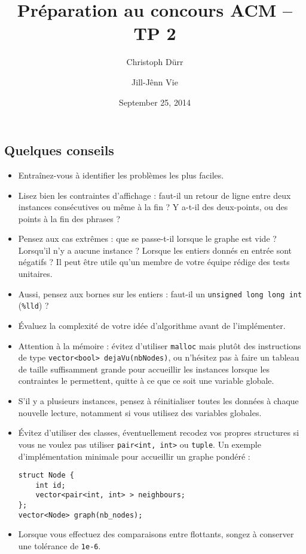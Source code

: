 \documentclass[12pt]{article}
\title{Préparation au concours ACM -- TP 2}
\author{Christoph Dürr \and Jill-Jênn Vie}
\date{September 25, 2014}
\begin{document}
\maketitle
\subsection*{Quelques conseils}

\begin{itemize}
\item Entraînez-vous à identifier les problèmes les plus faciles.
\item Lisez bien les contraintes d'affichage : faut-il un retour de ligne entre deux instances consécutives ou même à la fin ? Y a-t-il des deux-points, ou des points à la fin des phrases ?
\item Pensez aux cas extrêmes : que se passe-t-il lorsque le graphe est vide ? Lorsqu'il n'y a aucune instance ? Lorsque les entiers donnés en entrée sont négatifs ? Il peut être utile qu'un membre de votre équipe rédige des tests unitaires.
\item Aussi, pensez aux bornes sur les entiers : faut-il un \texttt{unsigned long long int} (\texttt{\%lld}) ?
\item Évaluez la complexité de votre idée d'algorithme avant de l'implémenter.
\item Attention à la mémoire : évitez d'utiliser \texttt{malloc} mais plutôt des instructions de type \texttt{vector<bool> dejaVu(nbNodes)}, ou n'hésitez pas à faire un tableau de taille suffisamment grande pour accueillir les instances lorsque les contraintes le permettent, quitte à ce que ce soit une variable globale.
\item S'il y a plusieurs instances, pensez à réinitialiser toutes les données à chaque nouvelle lecture, notamment si vous utilisez des variables globales.
\item Évitez d'utiliser des classes, éventuellement recodez vos propres structures si vous ne voulez pas utiliser \texttt{pair<int, int>} ou \texttt{tuple}. Un exemple d'implémentation minimale pour accueillir un graphe pondéré :
\begin{verbatim}
struct Node {
    int id;
    vector<pair<int, int> > neighbours;
};
vector<Node> graph(nb_nodes);
\end{verbatim}
\item Lorsque vous effectuez des comparaisons entre flottants, songez à conserver une tolérance de \texttt{1e-6}.
\end{itemize}






\end{document}
